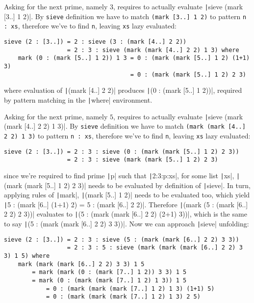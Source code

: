 Asking for the next prime, namely $3$, requires to actually evaluate
\texttt|sieve (mark [3..] 1 2)|. By \texttt{sieve} definition we have
to match \texttt{(mark [3..] 1 2)} to pattern \texttt{n : xs}, therefore we've to
find \texttt{n}, leaving \texttt{xs} lazy evaluated:
\begin{verbatim}
sieve (2 : [3..]) = 2 : sieve (3 : (mark [4..] 2 2)) 
                  = 2 : 3 : sieve (mark (mark [4..] 2 2) 1 3) where
    mark (0 : (mark [5..] 1 2)) 1 3 = 0 : (mark (mark [5..] 1 2) (1+1) 3)
                                    = 0 : (mark (mark [5..] 1 2) 2 3)
\end{verbatim}
where evaluation of \texttt|(mark [4..] 2 2)| produces
\texttt|(0 : (mark [5..] 1 2))|, required by pattern matching
in the \texttt|where| environment.

Asking for the next prime, namely $5$, requires to actually evaluate
\texttt|sieve (mark (mark [4..] 2 2) 1 3)|. By \texttt{sieve} definition we have
to match \texttt{(mark (mark [4..] 2 2) 1 3)} to pattern \texttt{n : xs}, therefore we've to
find \texttt{n}, leaving \texttt{xs} lazy evaluated:
\begin{verbatim}
sieve (2 : [3..]) = 2 : 3 : sieve (0 : (mark (mark [5..] 1 2) 2 3)) 
                  = 2 : 3 : sieve (mark (mark [5..] 1 2) 2 3)
\end{verbatim}
since we're required to find prime \texttt|p| such that \texttt|2:3:p:xs|,
for some list \texttt|xs|, \texttt|(mark (mark [5..] 1 2) 2 3)|
needs to be evaluated by definition of \texttt|sieve|. In turn,
applying rules of \texttt|mark|, \texttt|(mark [5..] 1 2)| needs
to be evaluated too, which yield \texttt|5 : (mark [6..] (1+1) 2) = 5 : (mark [6..] 2 2)|.
Therefore \texttt|(mark (5 : (mark [6..] 2 2) 2 3))| evaluates to
\texttt|(5 : (mark (mark [6..] 2 2) (2+1) 3))|, which is
the same to say \texttt|(5 : (mark (mark [6..] 2 2) 3 3))|.
Now we can approach \texttt|sieve| unfolding:
\begin{verbatim}
sieve (2 : [3..]) = 2 : 3 : sieve (5 : (mark (mark [6..] 2 2) 3 3))
                  = 2 : 3 : 5 : sieve (mark (mark (mark [6..] 2 2) 3 3) 1 5) where
    mark (mark (mark [6..] 2 2) 3 3) 1 5
        = mark (mark (0 : (mark [7..] 1 2)) 3 3) 1 5  
        = mark (0 : (mark (mark [7..] 1 2) 1 3)) 1 5
            = 0 : (mark (mark (mark [7..] 1 2) 1 3) (1+1) 5)
            = 0 : (mark (mark (mark [7..] 1 2) 1 3) 2 5)
\end{verbatim}

